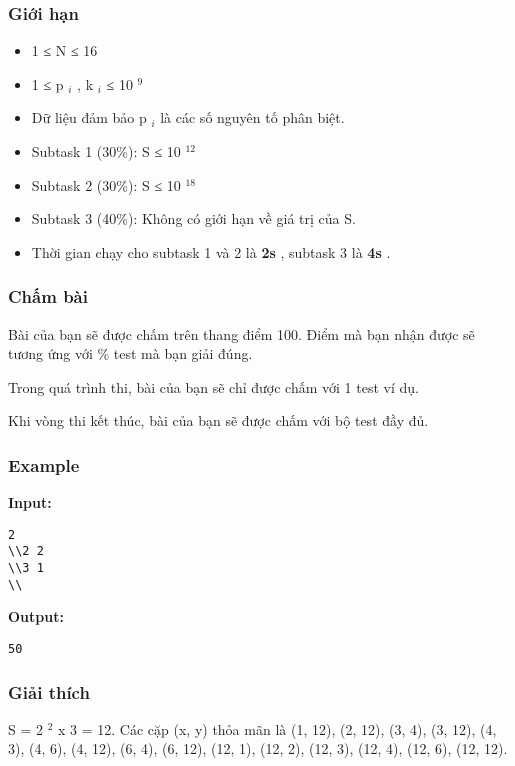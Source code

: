 \subsubsection{   Giới hạn  }
\begin{itemize}
	\item     1 ≤ N ≤ 16   
	\item     1 ≤ p    $_     i    $    , k    $_     i    $    ≤ 10    $^     9    $
	\item     Dữ liệu đảm bảo p    $_     i    $    là các số nguyên tố phân biệt.   
	\item     Subtask 1 (30\%): S ≤ 10    $^     12    $
	\item     Subtask 2 (30\%): S ≤ 10    $^     18    $
	\item     Subtask 3 (40\%): Không có giới hạn về giá trị của S.   
	\item     Thời gian chạy cho subtask 1 và 2 là    \textbf{     2s    }    , subtask 3 là    \textbf{     4s    }    .   
\end{itemize}

\subsubsection{   Chấm bài  }

   Bài của bạn sẽ được chấm trên thang điểm 100. Điểm mà bạn nhận được sẽ tương ứng với \% test mà bạn giải đúng.  

   Trong quá trình thi, bài của bạn sẽ chỉ được chấm với 1 test ví dụ.  

   Khi vòng thi kết thúc, bài của bạn sẽ được chấm với bộ test đầy đủ.  
\begin{itemize}
\end{itemize}
\begin{itemize}
\end{itemize}

\subsubsection{   Example  }

\textbf{    Input:   }
\begin{verbatim}
2
\\2 2
\\3 1 
\\\end{verbatim}

\textbf{    Output:   }
\begin{verbatim}
50
\end{verbatim}

\subsubsection{   Giải thích  }

   S = 2   $^    2   $   x 3 = 12. Các cặp (x, y) thỏa mãn là (1, 12), (2, 12), (3, 4), (3, 12), (4, 3), (4, 6), (4, 12), (6, 4), (6, 12), (12, 1), (12, 2), (12, 3), (12, 4), (12, 6), (12, 12).  